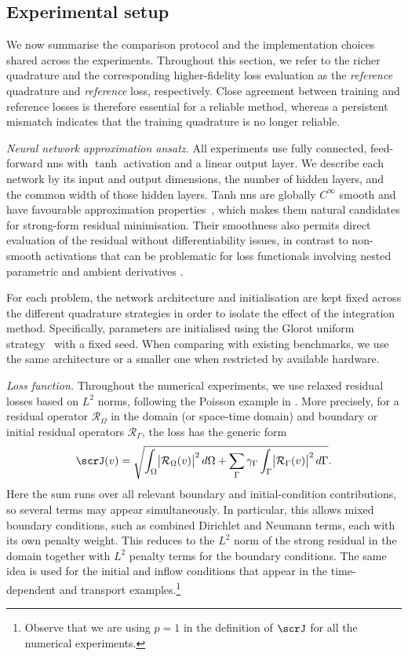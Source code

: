 \documentclass[oneside,reqno,11pt,a4paper]{amsart}
\theoremstyle{definition}
\begin{document}
\subsection{Experimental setup}

We now summarise the comparison protocol and the implementation choices shared
across the experiments. Throughout this section, we refer to the richer
quadrature and the corresponding higher-fidelity loss evaluation as the
\emph{reference} quadrature and \emph{reference} loss, respectively.
Close agreement between training and reference losses is therefore essential
for a reliable method, whereas a persistent mismatch indicates that the
training quadrature is no longer reliable.

\medskip
\noindent
\emph{Neural network approximation ansatz.}
All experiments use fully connected, feed-forward \acp{nn} with $\tanh$
activation and a linear output layer. We describe each network by its input and
output dimensions, the number of hidden layers, and the common width of those
hidden layers. Tanh \acp{nn} are globally $C^\infty$ smooth and have
favourable approximation properties~\cite{TanhDeRyck2021}, which makes them
natural candidates for strong-form residual minimisation. Their smoothness also
permits direct evaluation of the residual without differentiability issues, in
contrast to non-smooth activations that can be problematic for loss
functionals involving nested parametric and ambient derivatives
\cite{MagueresseBadiaAdaptive2024}.

For each problem, the network architecture and initialisation are kept fixed
across the different quadrature strategies in order to isolate the effect of
the integration method. Specifically, parameters are initialised using the
Glorot uniform strategy~\cite{GlorotBengio2010} with a fixed seed. When
comparing with existing benchmarks, we use the same architecture or a smaller
one when restricted by available hardware.

\medskip
\noindent
\emph{Loss function.}
Throughout the numerical experiments, we use relaxed residual losses based on
$L^2$ norms, following the Poisson example in
. More precisely, for a residual operator
$\mathcal{R}_\Omega$ in the domain (or space-time domain) and boundary or
initial residual operators $\mathcal{R}_\Gamma$, the loss has the generic form
\[
  \scrJ(v)
  =
  \sqrt{\int_{\Omega} \bigl|\mathcal{R}_\Omega(v)\bigr|^2 \, d\Omega
  +
  \sum_{\Gamma} \gamma_\Gamma \int_{\Gamma} \bigl|\mathcal{R}_\Gamma(v)\bigr|^2 \, d\Gamma}.
\]
Here the sum runs over all relevant boundary and initial-condition
contributions, so several terms may appear simultaneously. In particular, this
allows mixed boundary conditions, such as combined Dirichlet and Neumann terms,
each with its own penalty weight. This reduces to the $L^2$ norm of the strong
residual in the domain together with $L^2$ penalty terms for the boundary
conditions. The same idea is used for the initial and inflow conditions that
appear in the time-dependent and transport examples.\footnote{Observe that we
are using $p = 1$ in the definition of $\scrJ$ for all the numerical
experiments.}
\end{document}

